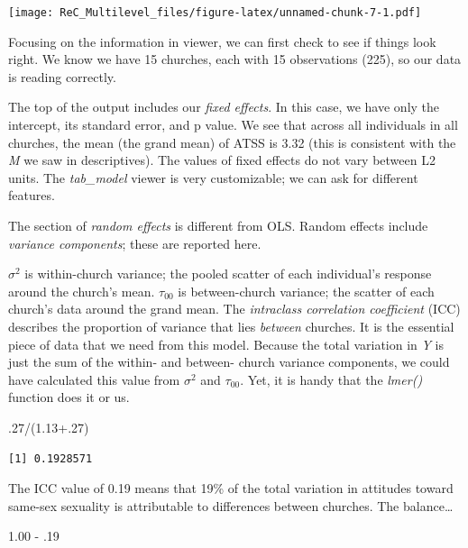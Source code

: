\documentclass[
  11pt,
]{book}
\newenvironment{Shaded}{\begin{snugshade}}{\end{snugshade}}
\newcommand{\DecValTok}[1]{\textcolor[rgb]{0.00,0.00,0.81}{#1}}
\newcommand{\FloatTok}[1]{\textcolor[rgb]{0.00,0.00,0.81}{#1}}
\newcommand{\NormalTok}[1]{#1}
\newcommand{\SpecialCharTok}[1]{\textcolor[rgb]{0.00,0.00,0.00}{#1}}
\begin{document}
\texttt{[image: ReC\_Multilevel\_files/figure-latex/unnamed-chunk-7-1.pdf]}

Focusing on the information in viewer, we can first check to see if things look right. We know we have 15 churches, each with 15 observations (225), so our data is reading correctly.

The top of the output includes our \emph{fixed effects}. In this case, we have only the intercept, its standard error, and p value. We see that across all individuals in all churches, the mean (the grand mean) of ATSS is 3.32 (this is consistent with the \emph{M} we saw in descriptives). The values of fixed effects do not vary between L2 units. The \emph{tab\_model} viewer is very customizable; we can ask for different features.

The section of \emph{random effects} is different from OLS. Random effects include \emph{variance components}; these are reported here.

\(\sigma^{2}\) is within-church variance; the pooled scatter of each individual's response around the church's mean.
\(\tau _{00}\) is between-church variance; the scatter of each church's data around the grand mean.
The \emph{intraclass correlation coefficient} (ICC) describes the proportion of variance that lies \emph{between} churches. It is the essential piece of data that we need from this model. Because the total variation in \emph{Y} is just the sum of the within- and between- church variance components, we could have calculated this value from \(\sigma^{2}\) and \(\tau _{00}\). Yet, it is handy that the \emph{lmer()} function does it or us.

\begin{Shaded}
\begin{Highlighting}[]
\NormalTok{.}\DecValTok{27}\SpecialCharTok{/}\NormalTok{(}\FloatTok{1.13+.27}\NormalTok{)}
\end{Highlighting}
\end{Shaded}

\begin{verbatim}
[1] 0.1928571
\end{verbatim}

The ICC value of 0.19 means that 19\% of the total variation in attitudes toward same-sex sexuality is attributable to differences between churches. The balance\ldots{}

\begin{Shaded}
\begin{Highlighting}[]
\FloatTok{1.00} \SpecialCharTok{{-}}\NormalTok{ .}\DecValTok{19}
\end{Highlighting}
\end{Shaded}
\end{document}
